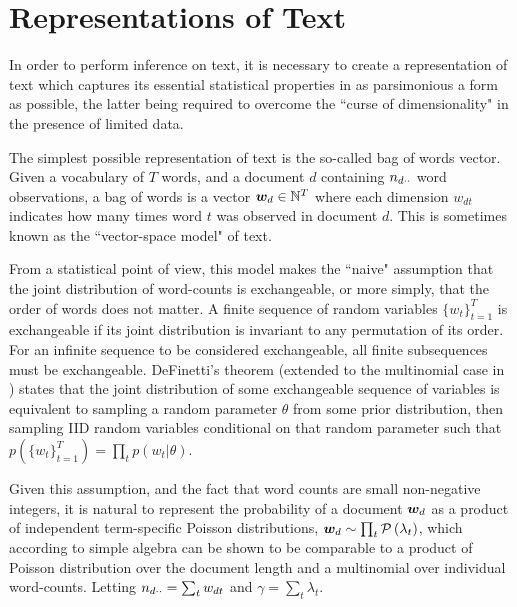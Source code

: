 

\section{Representations of Text}
In order to perform inference on text, it is necessary to create a representation of text which captures its essential statistical properties in as parsimonious a form as possible, the latter being required to overcome the ``curse of dimensionality"\cite{Bishop2006} in the presence of limited data.

The simplest possible representation of text is the so-called bag of words vector. Given a vocabulary of $T$ words, and a document $d$ containing ${ n_{d\cdot\cdot} }$ word observations, a bag of words is a vector $\bm w_d \in { \mathbb{N}^{T} }$ where each dimension $w_{dt}$ indicates how many times word $t$ was observed in document $d$. This is sometimes known as the ``vector-space model"\cite{Jst2004} of text. 

From a statistical point of view, this model makes the ``naive" assumption that the joint distribution of word-counts is exchangeable, or more simply, that the order of words does not matter. A finite sequence of random variables $\{w_t\}_{t=1}^{T}$ is exchangeable if its joint distribution is invariant to any permutation of its order. For an infinite sequence to be considered exchangeable, all finite subsequences must be exchangeable. DeFinetti's theorem (extended to the multinomial case in \cite{Hewitt1955}) states that the joint distribution of some exchangeable sequence of variables is equivalent to sampling a random parameter $\theta$ from some prior distribution, then sampling IID random variables conditional on that random parameter such that $p\left(\{w_t\}_{t=1}^{T}\right) = \prod_t p(w_t | \theta)$.

Given this assumption, and the fact that word counts are small non-negative integers, it is natural to represent the probability of a document ${ \bm w_d }$ as a product of independent term-specific Poisson distributions, ${ \bm w_d } \sim \prod_t \mathcal{P} \left( {\lambda_t} \right)$, which according to simple algebra can be shown to be comparable to a product of Poisson distribution over the document length and a multinomial over individual word-counts. Letting ${ n_{d\cdot\cdot} } = \sum_t { w_{dt} }$ and $\gamma = \sum_t \lambda_t$.

